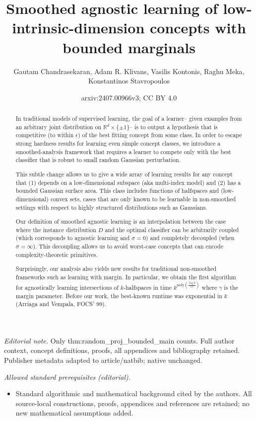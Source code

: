 \documentclass[10pt,a4paper]{article}
\title{Smoothed agnostic learning of low-intrinsic-dimension concepts with bounded marginals}
\author{Gautam Chandrasekaran, Adam R. Klivans, Vasilis Kontonis, Raghu Meka, Konstantinos Stavropoulos}
\date{arxiv:2407.00966v3; CC BY 4.0}
\newcommand{\poly}{\mathrm{poly}}
\newcommand{\1}{\Ind}
\begin{document}
\maketitle
\noindent\textit{Editorial note.} Only thm:random\_proj\_bounded\_main counts. Full author context, concept definitions, proofs, all appendices and bibliography retained. Publisher metadata adapted to article/natbib; native unchanged.\par\medskip
\noindent\textit{Allowed standard prerequisites (editorial).}\begin{itemize}
\item Standard algorithmic and mathematical background cited by the authors. All source-local constructions, proofs, appendices and references are retained; no new mathematical assumptions added.
\end{itemize}\medskip
\begin{abstract}%

In traditional models of supervised learning, the goal of a learner-- given examples from an arbitrary joint distribution on $\mathbb{R}^d \times \{\pm 1\}$-- is to output a hypothesis that is competitive (to within $\epsilon$) of the best fitting concept from some class.  In order to escape strong hardness results for learning even simple concept classes, we introduce a smoothed-analysis framework that requires a learner to compete only with the best classifier that is robust to small random Gaussian perturbation.

This subtle change allows us to give a wide array of learning results for any concept that (1) depends on a low-dimensional subspace (aka multi-index model) and (2) has a bounded Gaussian surface area.  This class includes functions of halfspaces and (low-dimensional) convex sets, cases that are only known to be learnable in non-smoothed settings with respect to highly structured distributions such as Gaussians.

Our definition of smoothed agnostic learning is an interpolation between the case where the instance distribution $D$ and the optimal classifier can be arbitrarily coupled (which corresponds to agnostic learning and $\sigma = 0$) and completely decoupled (when $\sigma = \infty$).  This decoupling allows us to avoid worst-case concepts that can encode complexity-theoretic primitives.

Surprisingly, our analysis also yields new results for traditional non-smoothed frameworks such as learning with margin.  In particular, we obtain the first algorithm for agnostically learning intersections of $k$-halfspaces in time  $k^{\poly(\frac{\log k}{\epsilon \gamma}) }$ where $\gamma$ is the margin parameter.  
Before our work, the best-known runtime was exponential in $k$ (Arriaga and Vempala, FOCS' 99).




\end{abstract}
\end{document}
